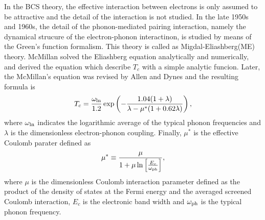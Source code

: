 In the BCS theory, the effective interaction between electrons is only assumed to be attractive and
the detail of the interaction is not studied.
In the late 1950s and 1960s, the detail of the phonon-mediated pairing interaction, namely the 
dynamical strucure of the electron-phonon interactinon, is studied by means of the Green's function 
formalism\cite{Migdal1958,Nambu1960,Eliashberg1960,Morel1962,Schrieffer1964,Scalapino1966}. 
This theory is called as Migdal-Eliashberg(ME) theory.
McMillan\cite{McMillan1968} solved the Eliashberg equation analytically and numerically, and derived
the equation which describe $T_c$ with a simple analytic funcion. Later, the McMillan's equation
was revised by Allen and Dynes\cite{AllenDynes} and the resulting formula is
%
\begin{equation}
	T_c = \frac{\omega_{\rm ln}}{1.2} \exp \left( -\frac{1.04(1+\lambda)}
	{\lambda-\mu^{\ast}(1+0.62\lambda)} \right),
	\label{eq:MAD}
\end{equation}
%
where $\omega_{\rm ln}$ indicates the logarithmic average of the typical phonon frequencies and
$\lambda$ is the dimensionless electron-phonon coupling. Finally, $\mu^{\ast}$ is the effective Coulomb
parater defined as
%
\begin{equation}
	\mu^{\ast} \equiv \frac{\mu}{1 + \mu \ln \left[ \frac{E_c}{\omega_{\rm ph}} \right]},
	\label{eq:mustar}
\end{equation}
%
where $\mu$ is the dimensionless Coulomb interaction parameter defined as the product of the density
of states at the Fermi energy and the averaged screened Coulomb interaction, $E_c$ is the
electronic band width and $\omega_{\rm ph}$ is the typical phonon frequency.




